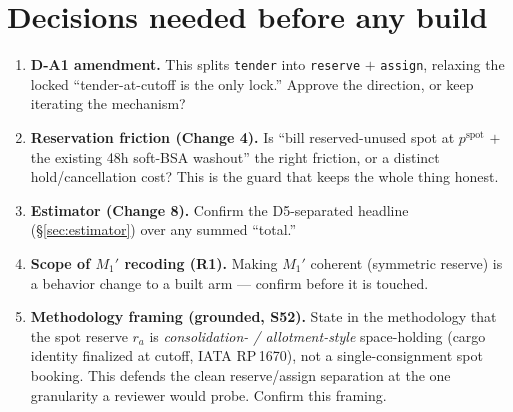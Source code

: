 \documentclass[11pt]{article}
\newcommand{\resv}{r}
\newcommand{\code}[1]{\texttt{#1}}
\begin{document}
\section{Decisions needed before any build}\label{sec:decisions}
\begin{enumerate}[leftmargin=1.4em,itemsep=1pt]
\item \textbf{D-A1 amendment.} This splits \code{tender} into \code{reserve} $+$ \code{assign}, relaxing the
locked ``tender-at-cutoff is the only lock.'' Approve the direction, or keep iterating the mechanism?
\item \textbf{Reservation friction (Change 4).} Is ``bill reserved-unused spot at $p^{\mathrm{spot}}$
$+$ the existing 48h soft-BSA washout'' the right friction, or a distinct hold/cancellation cost? This is
the guard that keeps the whole thing honest.
\item \textbf{Estimator (Change 8).} Confirm the D5-separated headline (\S\ref{sec:estimator}) over any
summed ``total.''
\item \textbf{Scope of $M_1'$ recoding (R1).} Making $M_1'$ coherent (symmetric reserve) is a
behavior change to a built arm --- confirm before it is touched.
\item \textbf{Methodology framing (grounded, S52).} State in the methodology that the spot reserve
$\resv_a$ is \emph{consolidation- / allotment-style} space-holding (cargo identity finalized at cutoff,
IATA RP\,1670), not a single-consignment spot booking. This defends the clean reserve/assign separation
at the one granularity a reviewer would probe. Confirm this framing.
\end{enumerate}
\end{document}

